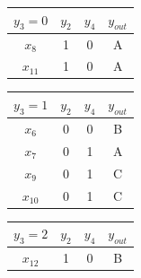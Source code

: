 \documentclass{article}
\begin{document}
\begin{enumerate}[leftmargin=\labelsep]
\begin{minipage}[t]{0.3\textwidth}
  \begin{table}[H]
    \centering
    \begin{tabular}{@{}cccc}
      $y_3 = 0$ & $y_2$ & $y_4$ & $y_{out}$ \\ \midrule
      $x_8$    & 1 & 0 & A \\
      $x_{11}$ & 1 & 0 & A \\
    \end{tabular}
  \end{table}
\end{minipage}
\begin{minipage}[t]{0.3\textwidth}
  \begin{table}[H]
    \centering
    \begin{tabular}{@{}cccc}
      $y_3 = 1$ & $y_2$ & $y_4$ & $y_{out}$ \\ \midrule
      $x_6$    & 0 & 0 & B \\
      $x_7$    & 0 & 1 & A \\
      $x_9$    & 0 & 1 & C \\
      $x_{10}$ & 0 & 1 & C \\
    \end{tabular}
  \end{table}
\end{minipage}
\begin{minipage}[t]{0.3\textwidth}
  \begin{table}[H]
    \centering
    \begin{tabular}{@{}cccc}
      $y_3 = 2$ & $y_2$ & $y_4$ & $y_{out}$ \\ \midrule
      $x_{12}$ & 1 & 0 & B \\
    \end{tabular}
  \end{table}
\end{minipage}


\end{enumerate}
\end{document}

